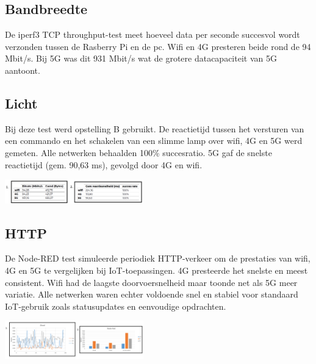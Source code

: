 \documentclass[a0,portrait]{hogent-poster}
\begin{document}
\begin{multicols}{2}
\begin{multicols}{2}
\subsection*{Bandbreedte}
De iperf3 TCP throughput-test meet hoeveel data per seconde succesvol wordt verzonden tussen de Rasberry Pi en de pc. Wifi en 4G presteren beide rond de 94 Mbit/s. Bij 5G was dit 931 Mbit/s wat de grotere datacapaciteit van 5G aantoont.\newline\newline

\subsection*{Licht}
Bij deze test werd opstelling B gebruikt. De reactietijd tussen het versturen van een commando en het schakelen van een slimme lamp over wifi, 4G en 5G werd gemeten. Alle netwerken behaalden 100\% succesratio. 5G gaf de snelste reactietijd (gem. 90,63 ms), gevolgd door 4G en wifi.
\end{multicols}

\begin{center}
    \captionsetup{type=figure}
    \includegraphics[width=0.45\textwidth]{../graphics/bandbreedteLicht.png}
\end{center}


\subsection*{HTTP}
De Node-RED test simuleerde periodiek HTTP-verkeer om de prestaties van wifi, 4G en 5G te vergelijken bij IoT-toepassingen. 4G presteerde het snelste en meest consistent. Wifi had de laagste doorvoersnelheid maar toonde net als 5G meer variatie. Alle netwerken waren echter voldoende snel en stabiel voor standaard IoT-gebruik zoals statusupdates en eenvoudige opdrachten.

\begin{center}
    \captionsetup{type=figure}
    \includegraphics[width=0.45\textwidth]{../graphics/http.png}
\end{center}

\end{multicols}
\end{document}
